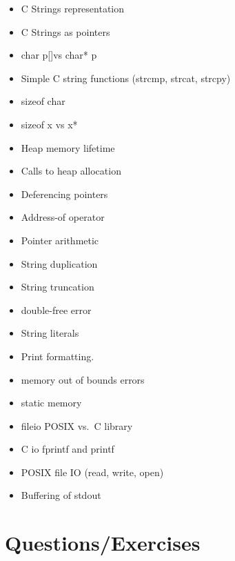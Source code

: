 \begin{itemize}
	\tightlist
	\item
	      C Strings representation
	\item
	      C Strings as pointers
	\item
	      char p{[}{]}vs char* p
	\item
	      Simple C string functions (strcmp, strcat, strcpy)
	\item
	      sizeof char
	\item
	      sizeof x vs x*
	\item
	      Heap memory lifetime
	\item
	      Calls to heap allocation
	\item
	      Deferencing pointers
	\item
	      Address-of operator
	\item
	      Pointer arithmetic
	\item
	      String duplication
	\item
	      String truncation
	\item
	      double-free error
	\item
	      String literals
	\item
	      Print formatting.
	\item
	      memory out of bounds errors
	\item
	      static memory
	\item
	      fileio POSIX vs.~C library
	\item
	      C io fprintf and printf
	\item
	      POSIX file IO (read, write, open)
	\item
	      Buffering of stdout
\end{itemize}

\section{Questions/Exercises}

